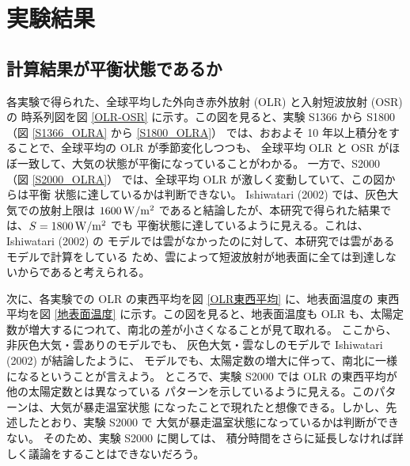 \documentclass[body]{subfiles}
\begin{document}
\chapter{実験結果}

\section{計算結果が平衡状態であるか}

各実験で得られた、全球平均した外向き赤外放射 (OLR) と入射短波放射 (OSR) の
時系列図を図 \ref{OLR-OSR} に示す。この図を見ると、実験 S1366
から S1800 （図 \ref{S1366_OLRA} から \ref{S1800_OLRA}）
では、おおよそ 10 年以上積分をすることで、全球平均の OLR が季節変化しつつも、
全球平均 OLR と OSR がほぼ一致して、大気の状態が平衡になっていることがわかる。
一方で、S2000 （図 \ref{S2000_OLRA}）
では、全球平均 OLR が激しく変動していて、この図からは平衡
状態に達しているかは判断できない。
Ishiwatari \etal (2002) では、灰色大気での放射上限は \(1600\hmu{W/m^2}\)
であると結論したが、本研究で得られた結果では、\(S=1800\hmu{W/m^2}\) でも
平衡状態に達しているように見える。これは、Ishiwatari \etal (2002) の
モデルでは雲がなかったのに対して、本研究では雲があるモデルで計算をしている
ため、雲によって短波放射が地表面に全ては到達しないからであると考えられる。

次に、各実験での OLR の東西平均を図 \ref{OLR東西平均} に、地表面温度の
東西平均を図 \ref{地表面温度} に示す。この図を見ると、地表面温度も
OLR も、太陽定数が増大するにつれて、南北の差が小さくなることが見て取れる。
ここから、非灰色大気・雲ありのモデルでも、
灰色大気・雲なしのモデルで Ishiwatari \etal (2002) が結論したように、
モデルでも、太陽定数の増大に伴って、南北に一様になるということが言えよう。
ところで、実験 S2000 では OLR の東西平均が他の太陽定数とは異なっている
パターンを示しているように見える。このパターンは、大気が暴走温室状態
になったことで現れたと想像できる。しかし、先述したとおり、実験 S2000 で
大気が暴走温室状態になっているかは判断ができない。
そのため、実験 S2000 に関しては、
積分時間をさらに延長しなければ詳しく議論をすることはできないだろう。
\end{document}
